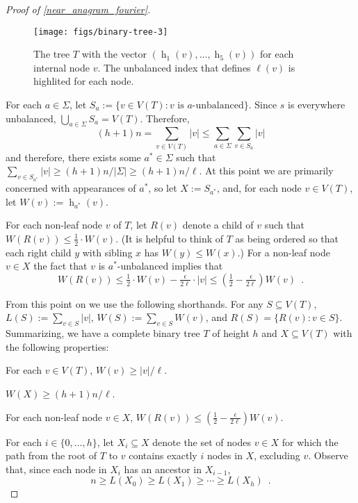 \documentclass{patmorin}
\DeclareMathOperator{\hist}{h}
\begin{document}
\begin{proof}[Proof of \cref{near_anagram_fourier}]
  \begin{figure}
    \begin{center}
       \texttt{[image: figs/binary-tree-3]}
    \end{center}
    \caption{The tree $T$ with the vector $(\hist_1(v),\ldots,\hist_5(v))$ for each
     internal node $v$.  The unbalanced index that defines $\ell(v)$ is highlited for each node.}
    \label{binary_tree_2}
  \end{figure}

  For each $a\in\Sigma$, let $S_a:=\{v\in V(T): \text{$v$ is $a$-unbalanced}\}$. Since $s$ is everywhere unbalanced, $\bigcup_{a\in\Sigma} S_a=V(T)$. Therefore,
  \[
     (h+1)n = \sum_{v\in V(T)}|v|\le \sum_{a\in\Sigma} \sum_{v\in S_a} |v|
  \]
  and therefore, there exists some $a^*\in\Sigma$ such that $\sum_{v\in S_{a^*}}|v|\ge (h+1)n/|\Sigma| \ge (h+1)n/\ell$.   At this point we are primarily concerned with appearances of $a^*$, so let $X:=S_{a^*}$, and, for each node $v\in V(T)$, let $W(v):=\hist_{a^*}(v)$.

  For each non-leaf node $v$ of $T$, let $R(v)$ denote a child of $v$ such that $W(R(v))\le \tfrac12\cdot W(v)$.  (It is helpful to think of $T$ as being ordered so that each right child $y$ with sibling $x$ has $W(y)\le W(x)$.)  For a non-leaf node $v\in X$ the fact that $v$ is $a^*$-unbalanced implies that
  \[  W(R(v)) \le \tfrac{1}{2}\cdot W(v) - \tfrac{\epsilon}{2\ell}\cdot |v|
      \le (\tfrac12-\tfrac{\epsilon}{2\ell})W(v) \enspace .
  \]

  From this point on we use the following shorthands. For any $S\subseteq V(T)$, $L(S):=\sum_{v\in S}|v|$, $W(S):=\sum_{v\in S}W(v)$, and $R(S)=\{R(v):v\in S\}$.  Summarizing, we have a complete binary tree $T$ of height $h$ and
  $X\subseteq V(T)$ with the following properties:
  \begin{compactenum}
    \item For each $v\in V(T)$,  $W(v)\ge |v|/\ell$.
    \item $W(X) \ge (h+1)n/\ell$.
    \item For each non-leaf node $v\in X$,
      $W(R(v)) \le (\tfrac{1}{2}-\tfrac{\epsilon}{2\ell})W(v)$.
  \end{compactenum}
  For each $i\in\{0,\ldots,h\}$, let $X_i\subseteq X$ denote the
  set of nodes $v\in X$ for which the path from the root of $T$ to $v$
  contains exactly $i$ nodes in $X$, excluding $v$. Observe that, since each node in $X_i$ has an ancestor in $X_{i-1}$,
  \[  n \ge L(X_0) \ge L(X_1) \ge \cdots\ge L(X_{h}) \enspace . \]


\end{proof}
\end{document}
